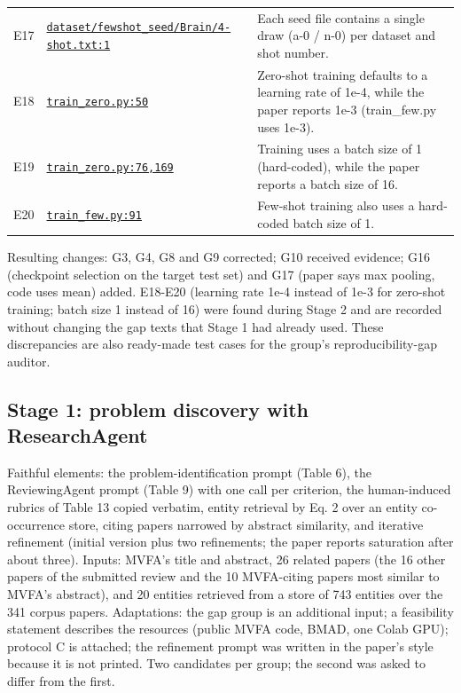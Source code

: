 \documentclass[11pt,a4paper]{article}
\begin{document}
{\begin{longtable}{@{}l P{3.6cm} P{10.8cm}@{}}
E17 & \href{https://github.com/MediaBrain-SJTU/MVFA-AD/blob/a30bf7bb2c51772a36e7be58d3c072be480620fe/dataset/fewshot_seed/Brain/4-shot.txt#L1}{\texttt{dataset/\allowbreak{}fewshot\_\allowbreak{}seed/\allowbreak{}Brain/\allowbreak{}4-shot.txt:1}} & Each seed file contains a single draw (a-0 / n-0) per dataset and shot number.\\
E18 & \href{https://github.com/MediaBrain-SJTU/MVFA-AD/blob/a30bf7bb2c51772a36e7be58d3c072be480620fe/train_zero.py#L50}{\texttt{train\_\allowbreak{}zero.py:50}} & Zero-shot training defaults to a learning rate of 1e-4, while the paper reports 1e-3 (train\_\allowbreak{}few.py uses 1e-3).\\
E19 & \href{https://github.com/MediaBrain-SJTU/MVFA-AD/blob/a30bf7bb2c51772a36e7be58d3c072be480620fe/train_zero.py#L76}{\texttt{train\_\allowbreak{}zero.py:76,169}} & Training uses a batch size of 1 (hard-coded), while the paper reports a batch size of 16.\\
E20 & \href{https://github.com/MediaBrain-SJTU/MVFA-AD/blob/a30bf7bb2c51772a36e7be58d3c072be480620fe/train_few.py#L91}{\texttt{train\_\allowbreak{}few.py:91}} & Few-shot training also uses a hard-coded batch size of 1.\\
\bottomrule\end{longtable}}
Resulting changes: G3, G4, G8 and G9 corrected; G10 received evidence; G16 (checkpoint selection on the target test set) and G17 (paper says max pooling, code uses mean) added. E18-E20 (learning rate 1e-4 instead of 1e-3 for zero-shot training; batch size 1 instead of 16) were found during Stage 2 and are recorded without changing the gap texts that Stage 1 had already used. These discrepancies are also ready-made test cases for the group's reproducibility-gap auditor.
\subsection{Stage 1: problem discovery with ResearchAgent}
Faithful elements: the problem-identification prompt (Table 6), the ReviewingAgent prompt (Table 9) with one call per criterion, the human-induced rubrics of Table 13 copied verbatim, entity retrieval by Eq. 2 over an entity co-occurrence store, citing papers narrowed by abstract similarity, and iterative refinement (initial version plus two refinements; the paper reports saturation after about three). Inputs: MVFA's title and abstract, 26 related papers (the 16 other papers of the submitted review and the 10 MVFA-citing papers most similar to MVFA's abstract), and 20 entities retrieved from a store of 743 entities over the 341 corpus papers. Adaptations: the gap group is an additional input; a feasibility statement describes the resources (public MVFA code, BMAD, one Colab GPU); protocol C is attached; the refinement prompt was written in the paper's style because it is not printed. Two candidates per group; the second was asked to differ from the first.
\end{document}

